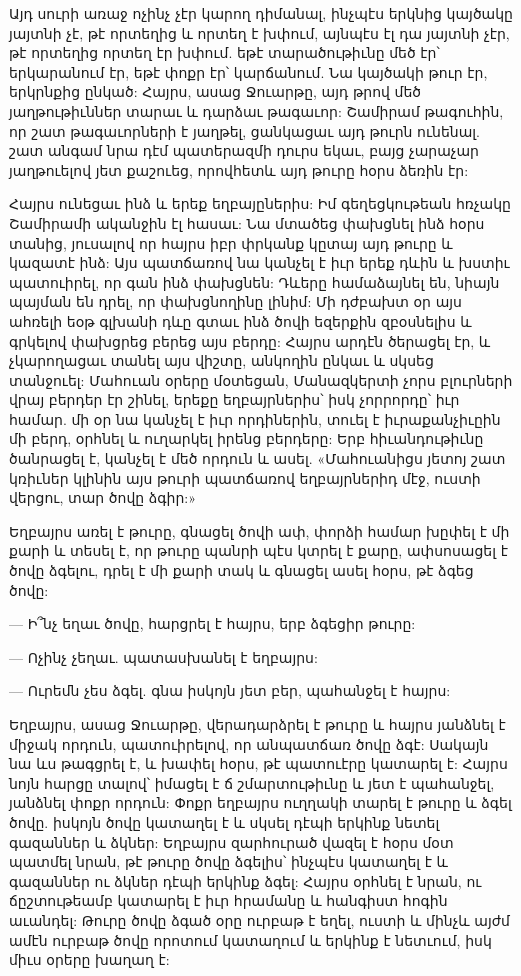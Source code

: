\documentclass{article}
\begin{document}
{Այդ սուրի առաջ ոչինչ չէր կարող դիմանալ, ինչպէս երկնից կայծակը յայտնի չէ, թէ որտեղից և որտեղ է խփում, այնպէս էլ դա յայտնի չէր, թէ որտեղից որտեղ էր խփում. եթէ տարածութիւնը մեծ էր՝ երկարանում էր, եթէ փոքր էր՝ կարճանում. Նա կայծակի թուր էր, երկրնքից ընկած: Հայրս, ասաց Ջուարթը, այդ թրով մեծ յաղթութիւններ տարաւ և դարձաւ թագաւոր: Շամիրամ թագուհին, որ շատ թագաւորների է յաղթել, ցանկացաւ այդ թուրն ունենալ. շատ անգամ նրա դէմ պատերազմի դուրս եկաւ, բայց չարաչար յաղթուելով յետ քաշուեց, որովհետև այդ թուրը հօրս ձեռին էր:

Հայրս ունեցաւ ինձ և երեք եղբայըներիս: Իմ գեղեցկութեան հռչակը Շամիրամի ականջին էլ հասաւ: Նա մտածեց փախցնել ինձ հօրս տանից, յուսալով որ հայրս իբր փրկանք կըտայ այդ թուրը և կազատէ ինձ: Այս պատճառով նա կանչել է իւր երեք դևին և խստիւ պատուիրել, որ գան ինձ փախցնեն: Դևերը համաձայնել են, նիայն պայման են դրել, որ փախցնողինը լինիմ: Մի դժբախտ օր այս ահռելի եօթ գլխանի դևը գտաւ ինձ ծովի եզերքին զբօսնելիս և գրկելով փախցրեց բերեց այս բերդը: Հայրս արդէն ծերացել էր, և չկարողացաւ տանել այս վիշտը, անկողին ընկաւ և սկսեց տանջուել: Մահուան օրերը մօտեցան, Մանազկերտի չորս բլուրների վրայ բերդեր էր շինել, երեքը եղբայրներիս՝ իսկ չորրորդը՝ իւր համար. մի օր նա կանչել է իւր որդիներին, տուել է իւրաքանչիւըին մի բերդ, օրհնել և ուղարկել իրենց բերդերը: Երբ հիւանդութիւնը ծանրացել է, կանչել է մեծ որդուն և ասել. «Մահուանիցս յետոյ շատ կռիւներ կլինին այս թուրի պատճառով եղբայրներիդ մէջ, ուստի վերցու, տար ծովը ձգիր:»

Եղբայրս առել է թուրը, գնացել ծովի ափ, փորձի համար խըփել է մի քարի և տեսել է, որ թուրը պանրի պէս կտրել է քարը, ափսոսացել է ծովը ձգելու, դրել է մի քարի տակ և գնացել ասել հօրս, թէ ձգեց ծովը:

— Ի՞նչ եղաւ ծովը, հարցրել է հայրս, երբ ձգեցիր թուրը:

— Ոչինչ չեղաւ. պատասխանել է եղբայրս:

— Ուրեմն չես ձգել. գնա իսկոյն յետ բեր, պահանջել է հայրս:

Եղբայրս, ասաց Ջուարթը, վերադարձրել է թուրը և հայրս յանձնել է միջակ որդուն, պատուիրելով, որ անպատճառ ծովը ձգէ: Սակայն նա ևս թագցրել է, և խափել հօրս, թէ պատուէրը կատարել է: Հայրս նոյն հարցը տալով՝ իմացել է ճ շմարտութիւնը և յետ է պահանջել, յանձնել փոքր որդուն: Փոքր եղբայրս ուղղակի տարել է թուրը և ձգել ծովը. իսկոյն ծովը կատաղել է և սկսել դէպի երկինք նետել գազաններ և ձկներ: Եղբայրս զարհուրած վազել է հօրս մօտ պատմել նրան, թէ թուրը ծովը ձգելիս՝ ինչպէս կատաղել է և գազաններ ու ձկներ դէպի երկինք ձգել: Հայրս օրհնել է նրան, ու ճըշտութեամբ կատարել է իւր հրամանը և հանգիստ հոգին աւանդել: Թուրը ծովը ձգած օրը ուրբաթ է եղել, ուստի և մինչև այժմ ամէն ուրբաթ ծովը որոտում կատաղում և երկինք է նետւում, իսկ միւս օրերը խաղաղ է:

}
\end{document}
